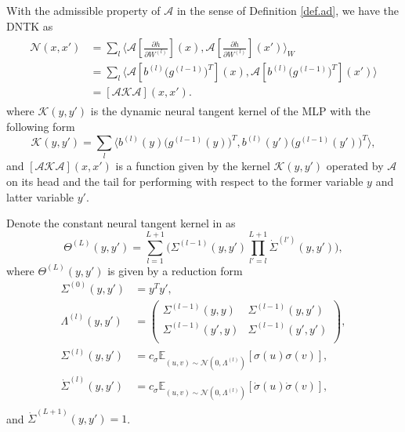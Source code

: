 \documentclass[hyperref]{article}
\newcommand{\pl}{\partial}
\numberwithin{equation}{section}
\theoremstyle{nonumberplain}
\begin{document}
	With the admissible property of $\mathcal{A}$ in the sense of Definition \ref{def.ad}, we have the DNTK as
	\begin{align}
		\begin{split}
			\mathcal{N}(x,x') &=\sum_{l}\bigl\langle\mathcal{A}[\frac{\pl h}{\pl W^{(l)}}](x),\mathcal{A}[\frac{\pl h}{\pl W^{(l)}}](x')\bigr\rangle_W\\
			& = \sum_l\bigl\langle\mathcal{A}[b^{(l)}\bigl(g^{(l-1)}\bigr)^T](x) ,\mathcal{A}[b^{(l)}\bigl(g^{(l-1)}\bigr)^T](x') \bigl\rangle\\
			& = [\mathcal{A}\mathcal{K}\mathcal{A}](x,x').
		\end{split}
	\end{align}
	where $\mathcal{K}(y, y')$ is the dynamic neural tangent kernel of the MLP with the following form \cite{allen2019convergence}
	\begin{equation}
		\mathcal{K}(y,y')=\sum_l\bigl\langle b^{(l)}(y)\bigl(g^{(l-1)}(y)\bigr)^T, b^{(l)}(y')\bigl(g^{(l-1)}(y')\bigr)^T \bigl\rangle,
	\end{equation} and $[\mathcal{A}\mathcal{K}\mathcal{A}](x,x')$ is a function given by the kernel $\mathcal{K}(y,y')$ operated by $\mathcal{A}$ on its head and the tail for performing with respect to the former variable $y$ and latter variable $y'$. 
	
	Denote the constant neural tangent kernel in \cite{arora2019exact} as 
	\begin{equation}
		\Theta^{(L)}(y,y')=\sum_{l=1}^{L+1}\biggl(\Sigma^{(l-1)}(y,y')\prod_{l'=l}^{L+1}\dot{\Sigma}^{(l')}(y,y')\biggr),
	\end{equation}
	where $\Theta^{(L)}(y,y')$ is given by a reduction form
	\begin{align}
		\Sigma^{(0)}(y,y') &= y^Ty',\\
		\Lambda^{(l)}(y,y') &= \begin{pmatrix}
			\Sigma^{(l-1)}(y,y) & \Sigma^{(l-1)}(y,y')\\
			\Sigma^{(l-1)}(y',y) & \Sigma^{(l-1)}(y',y')\\ 
		\end{pmatrix},\\
		\Sigma^{(l)}(y,y') &= c_\sigma\mathbb{E}_{(u,v)\sim \mathcal{N}(0,\Lambda^{(l)})}[\sigma(u)\sigma(v)],\\
		\dot{\Sigma}^{(l)}(y,y') &= c_\sigma\mathbb{E}_{(u,v)\sim \mathcal{N}(0,\Lambda^{(l)})}[\dot{\sigma}(u)\dot{\sigma}(v)],\\
	\end{align}
	and $\dot{\Sigma}^{(L+1)}(y,y')=1$.
	
\end{document}
